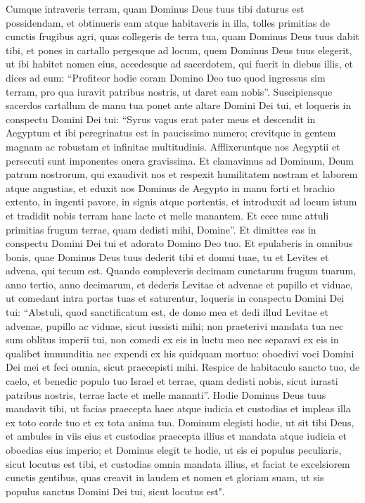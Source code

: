 \begin{biblechapter} 
\verse Cumque intraveris terram, quam Dominus Deus tuus tibi daturus est possidendam, et obtinueris eam atque habitaveris in illa, 
\verse tolles primitias de cunctis frugibus agri, quas collegeris de terra tua, quam Dominus Deus tuus dabit tibi, et pones in cartallo pergesque ad locum, quem Dominus Deus tuus elegerit, ut ibi habitet nomen eius, 
\verse accedesque ad sacerdotem, qui fuerit in diebus illis, et dices ad eum: “Profiteor hodie coram Domino Deo tuo quod ingressus sim terram, pro qua iuravit patribus nostris, ut daret eam nobis”. 
\verse Suscipiensque sacerdos cartallum de manu tua ponet ante altare Domini Dei tui,  
\verse et loqueris in conspectu Domini Dei tui: “Syrus vagus erat pater meus et descendit in Aegyptum et ibi peregrinatus est in paucissimo numero; crevitque in gentem magnam ac robustam et infinitae multitudinis. 
\verse Afflixeruntque nos Aegyptii et persecuti sunt imponentes onera gravissima. 
\verse Et clamavimus ad Dominum, Deum patrum nostrorum, qui exaudivit nos et respexit humilitatem nostram et laborem atque angustias, 
\verse et eduxit nos Dominus de Aegypto in manu forti et brachio extento, in ingenti pavore, in signis atque portentis,  
\verse et introduxit ad locum istum et tradidit nobis terram hanc lacte et melle manantem. 
\verse Et ecce nunc attuli primitias frugum terrae, quam dedisti mihi, Domine”. Et dimittes eas in conspectu Domini Dei tui et adorato Domino Deo tuo. 
\verse Et epulaberis in omnibus bonis, quae Dominus Deus tuus dederit tibi et domui tuae, tu et Levites et advena, qui tecum est. 
\verse Quando compleveris decimam cunctarum frugum tuarum, anno tertio, anno decimarum, et dederis Levitae et advenae et pupillo et viduae, ut comedant intra portas tuas et saturentur, 
\verse loqueris in conspectu Domini Dei tui: “Abstuli, quod sanctificatum est, de domo mea et dedi illud Levitae et advenae, pupillo ac viduae, sicut iussisti mihi; non praeterivi mandata tua nec sum oblitus imperii tui, 
\verse non comedi ex eis in luctu meo nec separavi ex eis in qualibet immunditia nec expendi ex his quidquam mortuo: oboedivi voci Domini Dei mei et feci omnia, sicut praecepisti mihi. 
\verse Respice de habitaculo sancto tuo, de caelo, et benedic populo tuo Israel et terrae, quam dedisti nobis, sicut iurasti patribus nostris, terrae lacte et melle mananti”. 
\verse Hodie Dominus Deus tuus mandavit tibi, ut facias praecepta haec atque iudicia et custodias et impleas illa ex toto corde tuo et ex tota anima tua. 
\verse Dominum elegisti hodie, ut sit tibi Deus, et ambules in viis eius et custodias praecepta illius et mandata atque iudicia et oboedias eius imperio; 
\verse et Dominus elegit te hodie, ut sis ei populus peculiaris, sicut locutus est tibi, et custodias omnia mandata illius, 
\verse et faciat te excelsiorem cunctis gentibus, quas creavit in laudem et nomen et gloriam suam, ut sis populus sanctus Domini Dei tui, sicut locutus est". 
\end{biblechapter}

